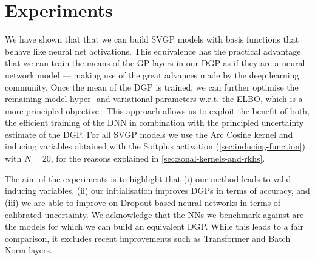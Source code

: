 



\section{Experiments}
\label{sec:experiments}

We have shown that that we can build SVGP models with basis functions that behave like neural net activations. This equivalence has the practical advantage that we can train the means of the GP layers in our DGP as if they are a neural network model --- making use of the great advances made by the deep learning community. Once the mean of the DGP is trained, we can further optimise the remaining model hyper- and variational parameters w.r.t. the ELBO, which is a more principled objective \citep{Fong2019On}. This approach allows us to exploit the benefit of both, the efficient training of the DNN in combination with the principled uncertainty estimate of the DGP. For all SVGP models we use the Arc Cosine kernel and inducing variables obtained with the Softplus activation (\cref{sec:inducing-function}) with $\tilde{N} = 20$, for the reasons explained in \cref{sec:zonal-kernels-and-rkhs}.

The aim of the experiments is to highlight that (i) our method leads to valid inducing variables, (ii) our initialisation improves DGPs in terms of accuracy, and (iii) we are able to improve on Dropout-based \citep{Gal2016dropout} neural networks in terms of calibrated uncertainty. 
We acknowledge that the NNs we benchmark against are the models for which we can build an equivalent DGP. While this leads to a fair comparison, it excludes recent improvements such as Transformer and Batch Norm layers.


